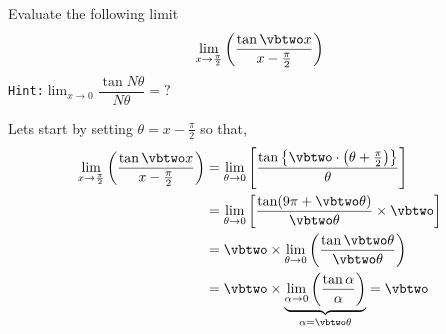 

\MULTIPLY{}\vbtwo

\question Evaluate the following limit \[ \lim_{x\to\frac\pi{2}}\left(\dfrac{\tan\vbtwo x}{x-\frac{\pi}{2}}\right)\]
\texttt{Hint:}$\lim_{x\to 0}\dfrac{\tan N\theta}{N\theta} = ?$

\begin{solution}
  Lets start by setting $\theta = x - \frac{\pi}{2}$ so that,
  \begin{align}
    \lim_{x\to\frac\pi{2}}\left( \dfrac{\tan\vbtwo x}{x-\frac\pi{2}}\right) &= 
    \lim_{\theta\to 0}\left[ 
    \dfrac{\tan\left\lbrace\vbtwo\cdot\left( \theta + \frac\pi{2} \right)\right\rbrace}{\theta}
    \right] \\
    &= \lim_{\theta\to 0}\left[ \dfrac{\tan (\vbone\pi + \vbtwo\theta)}{\vbtwo\theta} \times\vbtwo\right] \\
    &= \vbtwo\times\lim_{\theta\to 0}\left( 
    \dfrac{\tan\vbtwo\theta}{\vbtwo\theta}\right) \\
    &= \vbtwo\times\underbrace{\lim_{\alpha\to 0}\left( \dfrac{\tan\alpha}{\alpha}\right)}_{\alpha=\vbtwo\theta} = \vbtwo
  \end{align}

\end{solution}
